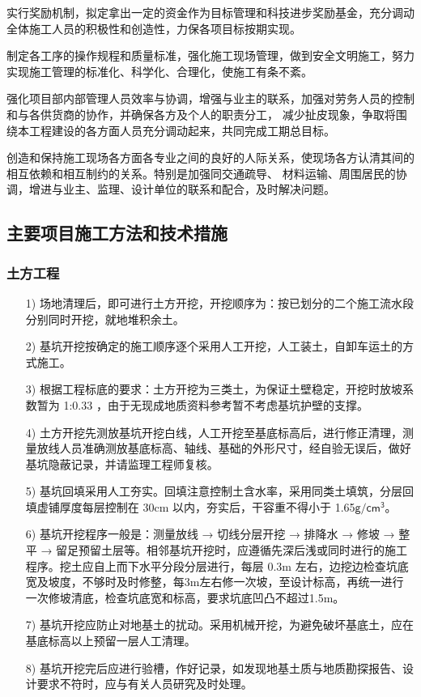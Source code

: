  实行奖励机制，拟定拿出一定的资金作为目标管理和科技进步奖励基金，充分调动全体施工人员的积极性和创造性，力保各项目标按期实现。

 制定各工序的操作规程和质量标准，强化施工现场管理，做到安全文明施工，努力实现施工管理的标准化、科学化、合理化，使施工有条不紊。

 强化项目部内部管理人员效率与协调，增强与业主的联系，加强对劳务人员的控制和与各供货商的协作，并确保各方及个人的职责分工，
减少扯皮现象，争取将围绕本工程建设的各方面人员充分调动起来，共同完成工期总目标。

 创造和保持施工现场各方面各专业之间的良好的人际关系，使现场各方认清其间的相互依赖和相互制约的关系。特别是加强同交通疏导、
材料运输、周围居民的协调，增进与业主、监理、设计单位的联系和配合，及时解决问题。

\subsection{主要项目施工方法和技术措施}
\subsubsection{土方工程}

\begin{itemize}
    \item [1)]场地清理后，即可进行土方开挖，开挖顺序为：按已划分的二个施工流水段分别同时开挖，就地堆积余土。
    \item [2)]基坑开挖按确定的施工顺序逐个采用人工开挖，人工装土，自卸车运土的方式施工。
    \item [3)]根据工程标底的要求：土方开挖为三类土，为保证土壁稳定，开挖时放坡系数暂为 1:0.33 ，由于无现成地质资料参考暂不考虑基坑护壁的支撑。
    \item [4)]土方开挖先测放基坑开挖白线，人工开挖至基底标高后，进行修正清理，测量放线人员准确测放基底标高、轴线、基础的外形尺寸，经自验无误后，做好基坑隐蔽记录，并请监理工程师复核。
    \item [5)]基坑回填采用人工夯实。回填注意控制土含水率，采用同类土填筑，分层回填虚铺厚度每层控制在 30cm 以内，夯实后，干容重不得小于 1.65$\mathsf{g/cm^3}$。
    \item [6)]基坑开挖程序一般是：测量放线 → 切线分层开挖 → 排降水 → 修坡 → 整平 → 留足预留土层等。相邻基坑开挖时，应遵循先深后浅或同时进行的施工程序。挖土应自上而下水平分段分层进行，每层 0.3m 左右，边挖边检查坑底宽及坡度，不够时及时修整，每3m左右修一次坡，至设计标高，再统一进行一次修坡清底，检查坑底宽和标高，要求坑底凹凸不超过1.5m。
    \item [7)]基坑开挖应防止对地基土的扰动。采用机械开挖，为避免破坏基底土，应在基底标高以上预留一层人工清理。
    \item [8)]基坑开挖完后应进行验槽，作好记录，如发现地基土质与地质勘探报告、设计要求不符时，应与有关人员研究及时处理。
\end{itemize}

